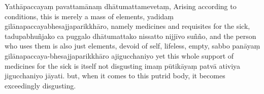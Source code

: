 \chantgap
\newpage
\begin{chantsubsection}
  \chantlineinline
    {Yathāpaccayaṃ pavattamānaṃ dhātumattamevetaṃ,}
    {Arising according to conditions, this is merely a mass of elements,}
  \chantlineinline
    {yadidaṃ gilānapaccayabhesajjaparikkhāro,}
    {namely medicines and requisites for the sick,}
  \chantlineinline
    {tadupabhuñjako ca puggalo dhātumattako nissatto nijjīvo suñño,}
    {and the person who uses them is also just elements, devoid of self, lifeless, empty,}
  \chantlineinline
    {sabbo panāyaṃ gilānapaccaya-bhesajjaparikkhāro ajigucchaniyo}
    {yet this whole support of medicines for the sick is itself not disgusting}
  \chantlineinline
    {imaṃ pūtikāyaṃ patvā ativiya jigucchaniyo jāyati.}
    {but, when it comes to this putrid body, it becomes exceedingly disgusting.}
\end{chantsubsection}
